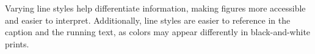 


\noindent Varying line styles help differentiate information, making figures more accessible and easier to interpret.
Additionally, line styles are easier to reference in the caption and the running text, as colors may appear differently in black-and-white prints.

